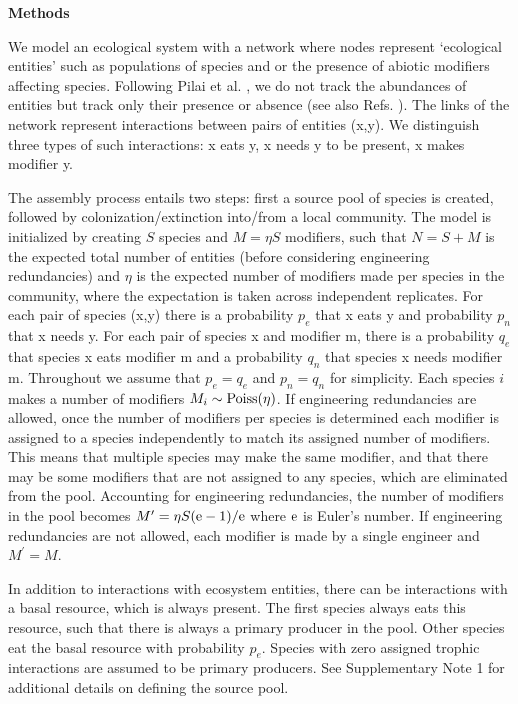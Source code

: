\documentclass[twocolumn,preprintnumbers,amsmath,amssymb,superscriptaddress,linenumbers]{revtex4-1}
\newcommand{\rr}[1]{{\rm #1}}
\begin{document}
\vspace{-2mm}
\noindent \textbf{Methods}\\
  \footnotesize{
  We model an ecological system with a network where nodes represent `ecological entities' such as populations of species and or the presence of abiotic modifiers affecting species.
  Following Pilai et al. \cite{Pillai2011}, we do not track the abundances of entities but track only their presence or absence (see also Refs. \cite{Luh1993,Campbell2011}).
  The links of the network represent interactions between pairs of entities (x,y).
  We distinguish three types of such interactions: x eats y, x needs y to be present, x makes modifier y.

  The assembly process entails two steps: first a source pool of species is created, followed by colonization/extinction into/from a local community.
  The model is initialized by creating $S$ species and $M = \eta S$ modifiers, such that $N=S+M$ is the expected total number of entities (before considering engineering redundancies) and $\eta$ is the expected number of modifiers made per species in the community, where the expectation is taken across independent replicates.
  For each pair of species (x,y) there is a probability $p_e$ that x eats y and probability $p_n$ that x needs y.
  For each pair of species x and modifier m, there is a probability $q_e$ that species x eats modifier m and a probability $q_n$ that species x needs modifier m.
  Throughout we assume that $p_e = q_e$ and $p_n = q_n$ for simplicity.
  Each species $i$ makes a number of modifiers $M_i \sim \rr{Poiss}(\eta)$. %
  If engineering redundancies are allowed, once the number of modifiers per species is determined each modifier is assigned to a species independently to match its assigned number of modifiers.
  This means that multiple species may make the same modifier, and that there may be some modifiers that are not assigned to any species, which are eliminated from the pool.
  Accounting for engineering redundancies, the number of modifiers in the pool becomes $M^\prime = \eta S (\rr{e}-1)/\rr{e}$ where $\rr{e}$ is Euler's number.
  If engineering redundancies are not allowed, each modifier is made by a single engineer and $M^\prime = M$.
  
  In addition to interactions with ecosystem entities, there can be interactions with a basal resource, which is always present.
  The first species always eats this resource, such that there is always a primary producer in the pool.
  Other species eat the basal resource with probability $p_e$.
  Species with zero assigned trophic interactions are assumed to be primary producers.
  See Supplementary Note 1 for additional details on defining the source pool.

}
\end{document}
